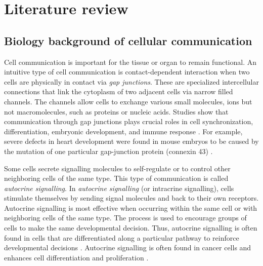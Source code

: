 \section{Literature review}
\subsection{Biology background of cellular communication}
Cell communication is important for the tissue or organ to remain functional. An intuitive  type of cell communication is contact-dependent interaction when two cells are physically in contact via \textit{gap junctions}. These are specialized intercellular connections that link the cytoplasm of two adjacent cells via narrow filled channels. The channels allow cells to exchange various small molecules, ions but not macromolecules, such as proteins or nucleic acids. Studies  show that communication through gap junctions plays crucial roles in cell synchronization, differentiation, embryonic development, and immune response \cite{white1999genetic, vinken2006connexins}. For example, severe defects in heart development were found in mouse embryos to be caused by the mutation of one particular gap-junction protein (connexin 43) \cite{huang1998gap}. 

Some cells secrete signalling molecules to self-regulate or to control other neighboring cells of the same type. This type of communication is called \textit{autocrine signalling}. In \textit{autocrine signalling} (or intracrine signalling), cells stimulate themselves by sending signal molecules and back to their own receptors.  Autocrine signalling is most effective when occurring within the same cell or with neighboring cells of the same type. The process is used to encourage groups of cells to make the same developmental decision. Thus, autocrine signalling is often found in cells that are differentiated along a particular pathway to reinforce developmental decisions \cite{alberts2018molecular}. Autocrine signalling is often found in cancer cells and enhances cell differentiation and proliferation \cite{sporn1985autocrine}.  

